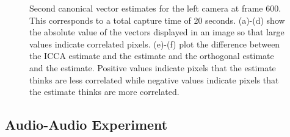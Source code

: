 \begin{figure}
\begin{center}
{    }
    \caption{Second canonical vector estimates for the left camera at frame 600. This corresponds
      to a total capture time of 20 seconds. (a)-(d) show the absolute value of the
      vectors displayed in an image so that large values indicate correlated
      pixels. (e)-(f) plot the difference between the ICCA estimate and the \iccap
      estimate and the orthogonal estimate and the \iccap estimate. Positive values
      indicate pixels that the \iccap estimate thinks are less correlated while negative
      values indicate pixels that the \iccap estimate thinks are more correlated. }
    \label{fig:chpt5:flashing1_2}
  \end{center}
\end{figure}


\subsection{Audio-Audio Experiment}

